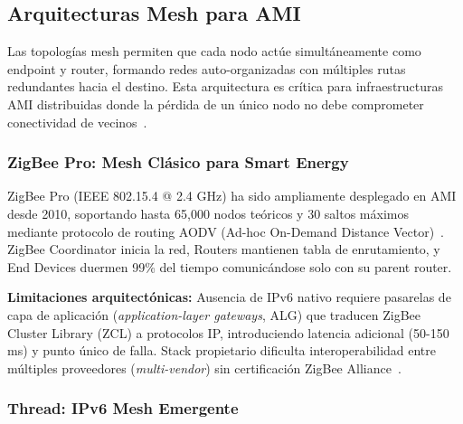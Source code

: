 


\subsection{Arquitecturas Mesh para AMI}
\label{sec:marco-estado-mesh}

Las topologías mesh permiten que cada nodo actúe simultáneamente como endpoint y router, formando redes auto-organizadas con múltiples rutas redundantes hacia el destino. Esta arquitectura es crítica para infraestructuras AMI distribuidas donde la pérdida de un único nodo no debe comprometer conectividad de vecinos~\cite{choudharyInternetThingsComprehensive2024}.

\subsubsection{ZigBee Pro: Mesh Clásico para Smart Energy}

ZigBee Pro (IEEE 802.15.4 @ 2.4 GHz) ha sido ampliamente desplegado en AMI desde 2010, soportando hasta 65,000 nodos teóricos y 30 saltos máximos mediante protocolo de routing AODV (Ad-hoc On-Demand Distance Vector)~\cite{zigbeealliance2018}. ZigBee Coordinator inicia la red, Routers mantienen tabla de enrutamiento, y End Devices duermen 99\% del tiempo comunicándose solo con su parent router.

\textbf{Limitaciones arquitectónicas:} Ausencia de IPv6 nativo requiere pasarelas de capa de aplicación (\textit{application-layer gateways}, ALG) que traducen ZigBee Cluster Library (ZCL) a protocolos IP, introduciendo latencia adicional (50-150 ms) y punto único de falla. Stack propietario dificulta interoperabilidad entre múltiples proveedores (\textit{multi-vendor}) sin certificación ZigBee Alliance~\cite{abdulsalamOverviewRecentWireless2024}.

\subsubsection{Thread: IPv6 Mesh Emergente}

